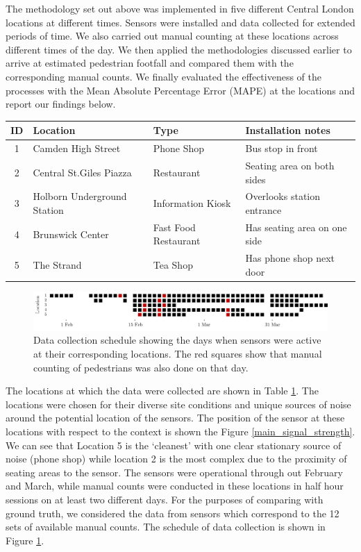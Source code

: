 The methodology set out above was implemented in five different Central London
locations at different times. Sensors were installed and data collected for
extended periods of time. We also carried out manual counting at these locations
across different times of the day. We then applied the methodologies discussed
earlier to arrive at estimated pedestrian footfall and compared them with the
corresponding manual counts.  We finally evaluated the effectiveness of the
processes with the Mean Absolute Percentage Error (MAPE) at the locations and
report our findings below.

\begin{table}
	{\begin{tabular}{clll} 
		\toprule
		 ID & Location & Type & Installation notes\\
		 \midrule
		 1 & Camden High Street & Phone Shop & Bus stop in front\\
		 2 & Central St.Giles Piazza & Restaurant & Seating area on both sides\\
		 3 & Holborn Underground Station & Information Kiosk & Overlooks station entrance\\
		 4 & Brunswick Center & Fast Food Restaurant & Has seating area on one side\\
		 5 & The Strand & Tea Shop & Has phone shop next door \\
		 \bottomrule
	\end{tabular}}
	\label{locations-table}
\end{table}

\begin{figure}
	\begin{center}
		\includegraphics [width=0.90\linewidth] {images/main_schedule.jpeg}
		\caption{Data collection schedule showing the days when sensors were active at their corresponding locations. The red squares show that manual counting of pedestrians was also done on that day.}
		\label{main_schedule}
	\end{center}
\end{figure}

The locations at which the data were collected are shown in Table
\ref{locations-table}. The locations were chosen for their diverse site
conditions and unique sources of noise around the potential location of the
sensors. The position of the sensor at these locations with respect to the
context is shown the Figure \ref{main_signal_strength}. We can see that
Location 5 is the `cleanest' with one clear stationary source of noise (phone
shop) while location 2 is the most complex due to the proximity of seating
areas to the sensor.  The sensors were operational through out February and
March, while manual counts were conducted in these locations in half hour
sessions on at least two different days. For the purposes of comparing with
ground truth, we considered the data from sensors which correspond to the 12
sets of available manual counts. The schedule of data collection is shown in
Figure \ref{main_schedule}.

